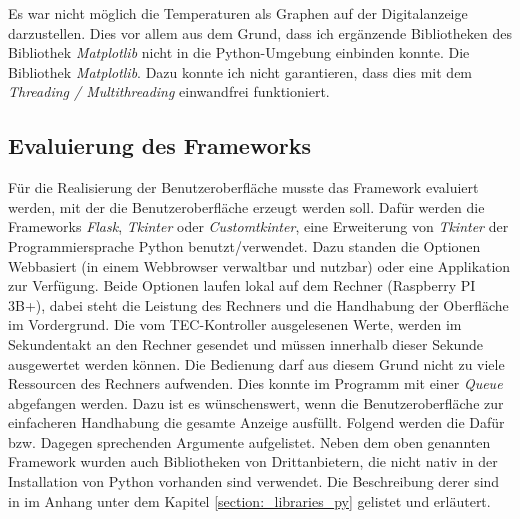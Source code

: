 Es war nicht möglich die Temperaturen als Graphen auf der Digitalanzeige darzustellen. Dies vor allem aus dem Grund, dass ich ergänzende Bibliotheken des Bibliothek \textit{Matplotlib} nicht in die Python-Umgebung einbinden konnte. Die Bibliothek \textit{Matplotlib}. Dazu konnte ich nicht garantieren, dass dies mit dem \textit{Threading / Multithreading} einwandfrei funktioniert.

\subsection{Evaluierung des Frameworks}
Für die Realisierung der Benutzeroberfläche musste das Framework evaluiert werden, mit der die Benutzeroberfläche erzeugt werden soll. Dafür werden die Frameworks \textit{Flask}, \textit{Tkinter} oder \textit{Customtkinter}, eine Erweiterung von \textit{Tkinter} der Programmiersprache Python benutzt/verwendet. Dazu standen die Optionen Webbasiert (in einem Webbrowser verwaltbar und nutzbar) oder eine Applikation zur Verfügung. Beide Optionen laufen lokal auf dem Rechner (Raspberry PI 3B+), dabei steht die Leistung des Rechners und die Handhabung der Oberfläche im Vordergrund. Die vom TEC-Kontroller ausgelesenen Werte, werden im Sekundentakt an den Rechner gesendet und müssen innerhalb dieser Sekunde ausgewertet werden können. Die Bedienung darf aus diesem Grund nicht zu viele Ressourcen des Rechners aufwenden. Dies konnte im Programm mit einer \textit{Queue} abgefangen werden. Dazu ist es wünschenswert, wenn die Benutzeroberfläche zur einfacheren Handhabung die gesamte Anzeige ausfüllt. Folgend werden die Dafür bzw. Dagegen sprechenden Argumente aufgelistet.
Neben dem oben genannten Framework wurden auch Bibliotheken von Drittanbietern, die nicht nativ in der Installation von Python vorhanden sind verwendet. Die Beschreibung derer sind in im Anhang unter dem Kapitel \ref{section:_libraries_py} gelistet und erläutert.


